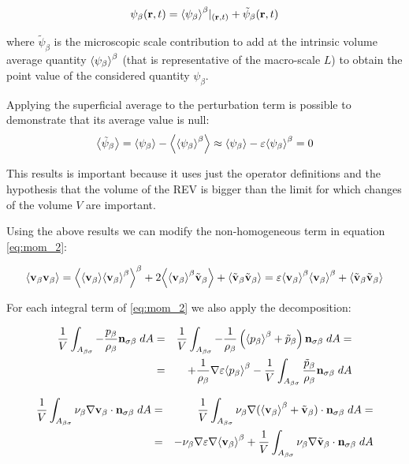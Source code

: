 \begin{equation}
\psi_{\beta}(\mathbf{r},t) = {\left< \psi_{\beta} \right>}^{\beta}|_{(\mathbf{r},t)} + \tilde{\psi}_{\beta}(\mathbf{r},t)
\end{equation}

where $\tilde{\psi}_{\beta}$ is the microscopic scale contribution to add at the intrinsic volume average quantity $ {\left< \psi_{\beta} \right>}^{\beta}$ (that is representative of the macro-scale $L$) to obtain the point value of the considered quantity $\psi_{\beta}$.

Applying the superficial average to the perturbation term is possible to demonstrate that its average value is null:
$$
{\left< \tilde{\psi}_{\beta} \right>} = {\left< \psi_{\beta} \right>} - {\left< {\left< \psi_{\beta} \right>}^{\beta} \right>} \approx {\left< \psi_{\beta} \right>} -\varepsilon {\left< \psi_{\beta} \right>}^{\beta} = 0
$$


This results is important because it uses just the operator definitions and the hypothesis that the volume of the REV is bigger than the limit for which changes of the volume $V$ are important.

Using the above results we can modify the non-homogeneous term in equation \ref{eq:mom_2}:

\begin{equation}
{\left< \textbf{v}_{\beta}\textbf{v}_{\beta}\right>} = {\left< {\left< \textbf{v}_{\beta} \right>}{\left< \textbf{v}_{\beta} \right>}^{\beta} \right>}^{\beta} +2{\left< {\left< \textbf{v}_{\beta} \right>}^{\beta}\tilde{\textbf{v}}_{\beta} \right>} +{\left< \tilde{\textbf{v}}_{\beta} \tilde{\textbf{v}}_{\beta} \right>} = \varepsilon {\left< \textbf{v}_{\beta}\right>}^{\beta}{\left< \textbf{v}_{\beta} \right>}^{\beta} +{\left< \tilde{\textbf{v}}_{\beta}\tilde{\textbf{v}}_{\beta} \right>}
\label{eq:dec_1}
\end{equation}

For each integral term of \ref{eq:mom_2} we also apply the decomposition:

\begin{eqnarray}
\dfrac{1}{V} \int_{A_{\beta \sigma}}  -\dfrac{p_{\beta}}{\rho_{\beta}} \mathbf{n}_{\sigma \beta} \;dA &=& \dfrac{1}{V} \int_{A_{\beta \sigma}}  -\dfrac{1}{\rho_{\beta}} \left({\left< p_{\beta} \right>}^{\beta}  + \tilde{p}_{\beta}\right) \mathbf{n}_{\sigma \beta} \;dA = \nonumber \\
&=& +\dfrac{1}{\rho_{\beta}}\nabla\varepsilon {\left< p_{\beta}\right>}^{\beta} - \dfrac{1}{V} \int_{A_{\beta \sigma}} \dfrac{\tilde{p}_{\beta}}{\rho_{\beta}} \mathbf{n}_{\sigma \beta} \;dA
\end{eqnarray}


\begin{eqnarray}
\dfrac{1}{V} \int_{A_{\beta \sigma}} \nu_{\beta} \nabla \textbf{v}_{\beta} \cdot \mathbf{n}_{\sigma \beta} \;dA &=& \dfrac{1}{V} \int_{A_{\beta \sigma}} \nu_{\beta} \nabla ({\left< \textbf{v}_{\beta} \right>}^{\beta} +\tilde{\textbf{v}}_{\beta}) \cdot \mathbf{n}_{\sigma \beta} \;dA =  \nonumber \\
&=& - \nu_{\beta} \nabla \varepsilon \nabla {\left< \textbf{v}_{\beta}\right>}^{\beta} + \dfrac{1}{V} \int_{A_{\beta \sigma}} \nu_{\beta} \nabla \tilde{\textbf{v}}_{\beta} \cdot \mathbf{n}_{\sigma \beta} \;dA
\end{eqnarray}

